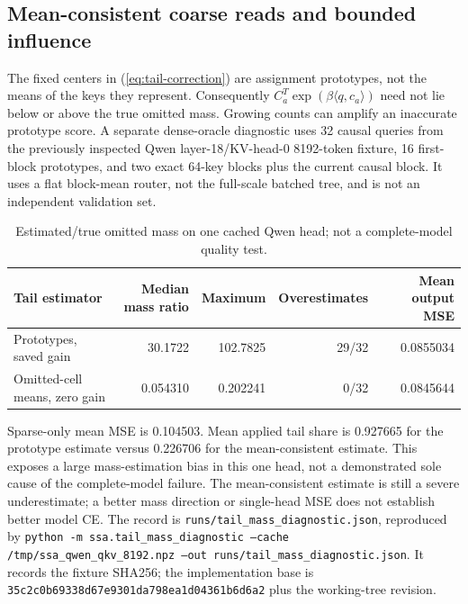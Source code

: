 \documentclass[11pt]{article}
\numberwithin{equation}{section}
\newcommand{\inner}[2]{\langle #1, #2\rangle}
\begin{document}
\subsection{Mean-consistent coarse reads and bounded influence}\label{sec:coarse-tail}

The fixed centers in (\ref{eq:tail-correction}) are assignment prototypes, not the means of the keys they
represent. Consequently $C_a^T\exp(\beta\inner{q}{c_a})$ need not lie below or above the true omitted
mass. Growing counts can amplify an inaccurate prototype score. A separate dense-oracle diagnostic uses
32 causal queries from the previously inspected Qwen layer-18/KV-head-0 8192-token fixture, 16 first-block
prototypes, and two exact 64-key blocks plus the current causal block. It uses a flat block-mean router,
not the full-scale batched tree, and is not an independent validation set.

\begin{table}[ht]
\centering\small
\begin{tabular}{@{}lrrrr@{}}\toprule
Tail estimator & Median mass ratio & Maximum & Overestimates & Mean output MSE\\\midrule
Prototypes, saved gain & 30.1722 & 102.7825 & 29/32 & 0.0855034\\
Omitted-cell means, zero gain & 0.054310 & 0.202241 & 0/32 & 0.0845644\\\bottomrule
\end{tabular}
\caption{Estimated/true omitted mass on one cached Qwen head; not a complete-model quality test.}
\end{table}

Sparse-only mean MSE is 0.104503. Mean applied tail share is 0.927665 for the prototype estimate versus
0.226706 for the mean-consistent estimate. This exposes a large mass-estimation bias in this one head,
not a demonstrated sole cause of the complete-model failure. The mean-consistent estimate is still a
severe underestimate; a better mass direction or single-head MSE does not establish better model CE.
The record is \texttt{runs/tail\_mass\_diagnostic.json}, reproduced by
\texttt{python -m ssa.tail\_mass\_diagnostic --cache /tmp/ssa\_qwen\_qkv\_8192.npz --out
runs/tail\_mass\_diagnostic.json}. It records the fixture SHA256; the implementation base is
\texttt{35c2c0b69338d67e9301da798ea1d04361b6d6a2} plus the working-tree revision.
\end{document}
